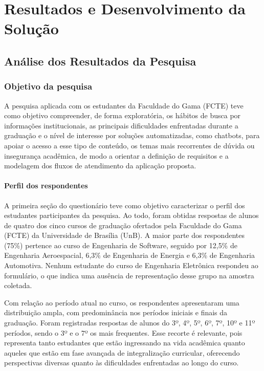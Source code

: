 \chapter[RESULTADOS]{Resultados e Desenvolvimento da Solução}

\section{Análise dos Resultados da Pesquisa}

\subsection{Objetivo da pesquisa}

A pesquisa aplicada com os estudantes da Faculdade do Gama (FCTE) teve como objetivo compreender, de forma exploratória, os hábitos de busca por informações institucionais, as principais dificuldades enfrentadas durante a graduação e o nível de interesse por soluções automatizadas, como chatbots, para apoiar o acesso a esse tipo de conteúdo, os temas mais recorrentes de dúvida ou insegurança acadêmica, de modo a orientar a definição de requisitos e a modelagem dos fluxos de atendimento da aplicação proposta.

\subsubsection{Perfil dos respondentes}

A primeira seção do questionário teve como objetivo caracterizar o perfil dos estudantes participantes da pesquisa. Ao todo, foram obtidas respostas de alunos de quatro dos cinco cursos de graduação ofertados pela Faculdade do Gama (FCTE) da Universidade de Brasília (UnB). A maior parte dos respondentes (75\%) pertence ao curso de Engenharia de Software, seguido por 12{,}5\% de Engenharia Aeroespacial, 6{,}3\% de Engenharia de Energia e 6{,}3\% de Engenharia Automotiva. Nenhum estudante do curso de Engenharia Eletrônica respondeu ao formulário, o que indica uma ausência de representação desse grupo na amostra coletada.

Com relação ao período atual no curso, os respondentes apresentaram uma distribuição ampla, com predominância nos períodos iniciais e finais da graduação. Foram registradas respostas de alunos do 3º, 4º, 5º, 6º, 7º, 10º e 11º períodos, sendo o 3º e o 7º os mais frequentes. Esse recorte é relevante, pois representa tanto estudantes que estão ingressando na vida acadêmica quanto aqueles que estão em fase avançada de integralização curricular, oferecendo perspectivas diversas quanto às dificuldades enfrentadas ao longo do curso.

